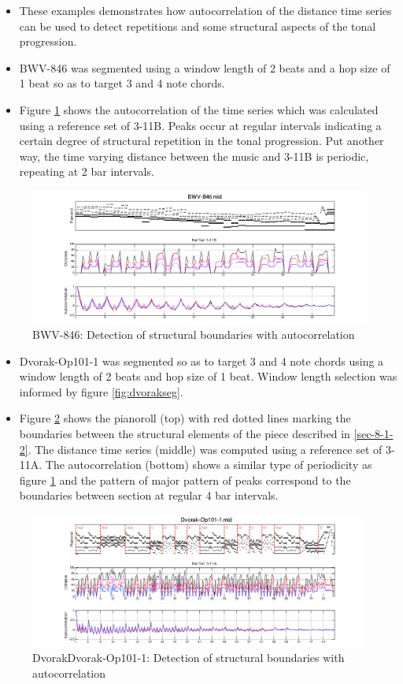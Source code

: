 \documentclass{article}
\begin{document}
\begin{itemize}
\item These examples demonstrates how autocorrelation of the distance time
  series can be used to detect repetitions and some structural aspects
  of the tonal progression.
\item BWV-846 was segmented using a window length of 2 beats and a hop
  size of 1 beat so as to target 3 and 4 note chords.
\item Figure \ref{fig:autocorrelation1} shows the autocorrelation of the
  time series which was calculated using a reference set of
  3-11B. Peaks occur at regular intervals indicating a certain degree
  of structural repetition in the tonal progression. Put another way,
  the time varying distance between the music and 3-11B is periodic,
  repeating at 2 bar intervals.
\end{itemize}
\begin{figure}[htb]
\centering
\includegraphics[width=.8\linewidth]{./plots/autocorrelation1.png}
\caption{\label{fig:autocorrelation1}BWV-846: Detection of structural boundaries with autocorrelation}
\end{figure}
\begin{itemize}
\item Dvorak-Op101-1 was segmented so as to target 3 and 4 note chords
  using a window length of 2 beats and hop size of 1 beat. Window
  length selection was informed by figure
  \ref{fig:dvorakseg}.
\item Figure \ref{fig:autocorrelation2} shows the pianoroll (top) with red
  dotted lines marking the boundaries between the structural elements
  of the piece described in \ref{sec-8-1-2}. The distance time series
  (middle) was computed using a reference set of 3-11A. The
  autocorrelation (bottom) shows a similar type of periodicity as
  figure \ref{fig:autocorrelation1} and the pattern of major pattern
  of peaks correspond to the boundaries between section at regular 4
  bar intervals.
\end{itemize}
\begin{figure}[htb]
\centering
\includegraphics[width=.8\linewidth]{./plots/autocorrelation2.png}
\caption{\label{fig:autocorrelation2}DvorakDvorak-Op101-1: Detection of structural boundaries with autocorrelation}
\end{figure}
\end{document}
